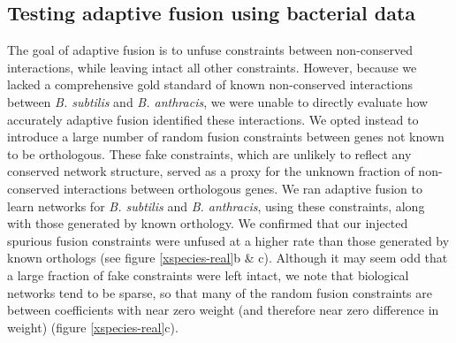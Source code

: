 \documentclass[11pt]{article}
\begin{document}
\subsection{Testing adaptive fusion using bacterial data}
 The goal of adaptive fusion is to unfuse constraints between non-conserved interactions, while leaving intact all other constraints. 
 However, because we lacked a comprehensive gold standard of known non-conserved interactions between \textit{B. subtilis} and \textit{B. anthracis}, we were unable to directly evaluate how accurately adaptive fusion identified these interactions.
  We opted instead to introduce a large number of random fusion constraints between genes not known to be orthologous. 
 These fake constraints, which are unlikely to reflect any conserved network structure, served as a proxy for the unknown fraction of non-conserved interactions between orthologous genes. 
 We ran adaptive fusion to learn networks for \textit{B. subtilis} and \textit{B. anthracis}, using these constraints, along with those generated by known orthology. 
 We confirmed that our injected spurious fusion constraints were unfused at a higher rate than those generated by known orthologs (see figure \ref{xspecies-real}b & c). 
 Although it may seem odd that a large fraction of fake constraints were left intact, we note that biological networks tend to be sparse, so that many of the random fusion constraints are between coefficients with near zero weight (and therefore near zero difference in weight) (figure \ref{xspecies-real}c). 
\end{document}
